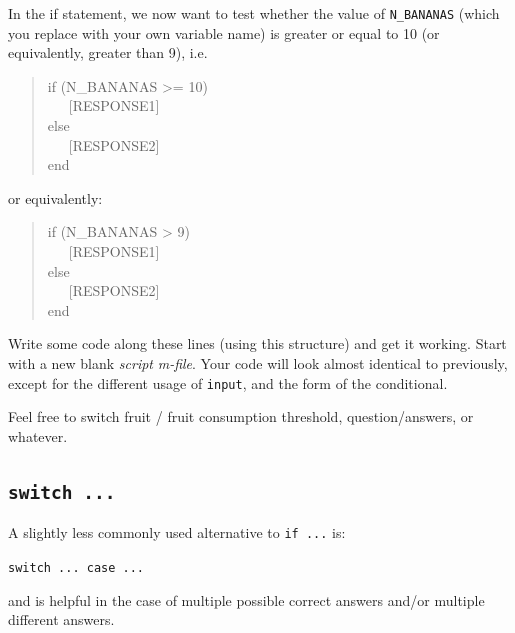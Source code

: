 \documentclass{tufte-book} %
\newenvironment{docspec}{\begin{quotation}\ttfamily\parskip0pt\parindent0pt\ignorespaces}{\end{quotation}}
\begin{document}
In the if statement, we now want to test whether the value of \texttt{N\_BANANAS} (which you replace with your own variable name) is greater or equal to 10 (or equivalently, greater than 9), i.e.
\begin{docspec}
if (N\_BANANAS >= 10)
\\ \ \ \ [RESPONSE1]
\\else
\\ \ \ \ [RESPONSE2]
\\end
\end{docspec}
or equivalently:
\begin{docspec}
if (N\_BANANAS > 9)
\\ \ \ \ [RESPONSE1]
\\else
\\ \ \ \ [RESPONSE2]
\\end
\end{docspec}

Write some  code along these lines (using this structure) and get it working. Start with a new blank \textit{script} \textit{m-file}. Your code will look almost identical to previously, except for the different usage of \texttt{input}, and the form of the conditional.

Feel free to switch fruit / fruit consumption threshold, question/answers, or whatever.

\newpage

\subsection{\texttt{switch ...}}

A slightly less commonly used alternative to \texttt{if ...} is:

\vspace{1mm}
\texttt{switch ... case ...} 
\vspace{1mm}

\noindent and is helpful in the case of multiple possible correct answers and/or multiple different answers.
\end{document}
